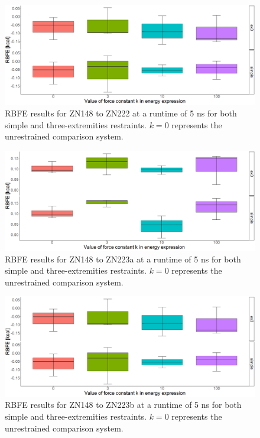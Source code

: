 \documentclass[oneside]{scrreprt}
\begin{document}
\begin{figure}[h]
    \centering
    \includegraphics[width=1\textwidth]{plots/boxplot_rbfe_zn222_5ns.png}
    \caption[RBFE results for ZN148 to ZN222]{RBFE results for ZN148 to ZN222 at a runtime of 5 ns for both simple and three-extremities restraints. $k=0$ represents the unrestrained comparison system.}
    
\end{figure}

\begin{figure}[h]
    \centering
    \includegraphics[width=1\textwidth]{plots/boxplot_rbfe_zn223a_5ns.png}
    \caption[RBFE results for ZN148 to ZN223a]{RBFE results for ZN148 to ZN223a at a runtime of 5 ns for both simple and three-extremities restraints. $k=0$ represents the unrestrained comparison system.}
    
\end{figure}

\begin{figure}[h]
    \centering
    \includegraphics[width=1\textwidth]{plots/boxplot_rbfe_zn222_5ns.png}
    \caption[RBFE results for ZN148 to ZN223b]{RBFE results for ZN148 to ZN223b at a runtime of 5 ns for both simple and three-extremities restraints. $k=0$ represents the unrestrained comparison system.}
    \label{fig:rbfeend}
\end{figure}
\newpage
\end{document}
